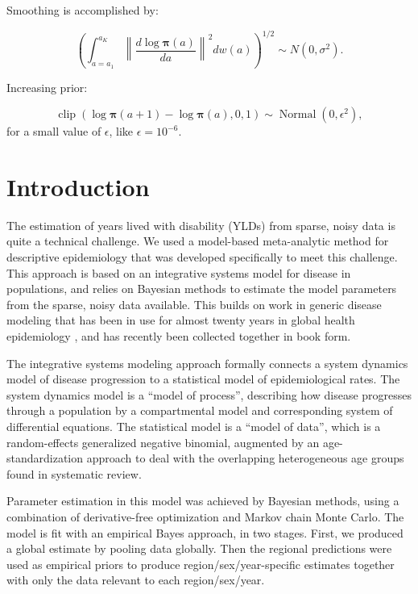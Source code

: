 \documentclass[12pt]{article}
\newcommand{\1}{\mathbf{1}}
\newcommand{\0}{\mathbf{0}}
\newcommand{\Normal}{\operatorname{Normal}}
\def\boldpi{{\boldsymbol{\pi}}}
\begin{document}
Smoothing is accomplished by:

\[
\left(\int _{a=a_1} ^{a_K} \left\| \frac{d \log \boldpi (a)}{da} \right\|^2 dw(a)\right)^{1/2} \sim N(0, \sigma^2).
\]


Increasing prior:

\[
\operatorname{clip}(\log \boldpi(a+1) - \log \boldpi(a), 0, 1) \sim \Normal(0, \epsilon^2),
\]
for a small value of $\epsilon$, like $\epsilon = 10^{-6}$.


\section{Introduction}
The estimation of years lived with disability (YLDs) from sparse,
noisy data is quite a technical challenge.  We used a model-based
meta-analytic method for descriptive epidemiology that was developed
specifically to meet this challenge.  This approach is based on an
integrative systems model for disease in populations, and relies on
Bayesian methods to estimate the model parameters from the sparse,
noisy data available.  This builds on work in generic disease modeling
that has been in use for almost twenty years in global health
epidemiology \cite{barendregt_generic_2003}, and has recently been
collected together in book form.

The integrative systems modeling approach formally connects a system
dynamics model of disease progression to a statistical model of
epidemiological rates.  The system dynamics model is a ``model of
process'', describing how disease progresses through a population by a
compartmental model and corresponding system of differential
equations.  The statistical model is a ``model of data'', which is a
random-effects generalized negative binomial, augmented by an
age-standardization approach to deal with the overlapping
heterogeneous age groups found in systematic review.

Parameter estimation in this model was achieved by Bayesian methods,
using a combination of derivative-free optimization and Markov chain
Monte Carlo.  The model is fit with an empirical Bayes approach, in
two stages.  First, we produced a global estimate by pooling data
globally.  Then the regional predictions were used as empirical priors
to produce region/sex/year-specific estimates together with only the
data relevant to each region/sex/year.
\end{document}
